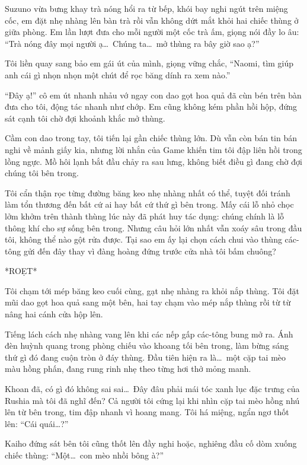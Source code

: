 ﻿\documentclass[../main.tex]{subfiles}
\begin{document}
Suzuno vừa bưng khay trà nóng hổi ra từ bếp, khói bay nghi ngút trên miệng cốc, em đặt nhẹ nhàng lên bàn trà rồi vẫn không dứt mắt khỏi hai chiếc thùng ở giữa phòng. Em lần lượt đưa cho mỗi người một cốc trà ấm, giọng nói đầy lo âu: ``Trà nóng đây mọi người ạ\dots\ Chúng ta\dots\ mở thùng ra bây giờ sao ạ?''

Tôi liền quay sang bảo em gái út của mình, giọng vững chắc, ``Naomi, tìm giúp anh cái gì nhọn nhọn một chút để rọc băng dính ra xem nào.''

``Đây ạ!'' cô em út nhanh nhảu vớ ngay con dao gọt hoa quả đã cùn bén trên bàn đưa cho tôi, động tác nhanh như chớp. Em cũng không kém phần hồi hộp, đứng sát cạnh tôi chờ đợi khoảnh khắc mở thùng.

Cầm con dao trong tay, tôi tiến lại gần chiếc thùng lớn. Dù vẫn còn bán tin bán nghi về mảnh giấy kia, nhưng lời nhắn của Game khiến tim tôi đập liên hồi trong lồng ngực. Mồ hôi lạnh bắt đầu chảy ra sau lưng, không biết điều gì đang chờ đợi chúng tôi bên trong.

Tôi cẩn thận rọc từng đường băng keo nhẹ nhàng nhất có thể, tuyệt đối tránh làm tổn thương đến bất cứ ai hay bất cứ thứ gì bên trong. Mấy cái lỗ nhỏ chọc lởm khởm trên thành thùng lúc này đã phát huy tác dụng: chúng chính là lỗ thông khí cho sự sống bên trong. Nhưng câu hỏi lớn nhất vẫn xoáy sâu trong đầu tôi, không thể nào gột rửa được. Tại sao em ấy lại chọn cách chui vào thùng các-tông gửi đến đây thay vì đàng hoàng đứng trước cửa nhà tôi bấm chuông?

*ROẸT*

Tôi chạm tới mép băng keo cuối cùng, gạt nhẹ nhàng ra khỏi nắp thùng. Tôi đặt mũi dao gọt hoa quả sang một bên, hai tay chạm vào mép nắp thùng rồi từ từ nâng hai cánh cửa hộp lên.

Tiếng lách cách nhẹ nhàng vang lên khi các nếp gấp các-tông bung mở ra. Ánh đèn huỳnh quang trong phòng chiếu vào khoang tối bên trong, làm bừng sáng thứ gì đó đang cuộn tròn ở đáy thùng. Đầu tiên hiện ra là\dots\ một cặp tai mèo màu hồng phấn, đang rung rinh nhẹ theo từng hơi thở mỏng manh.

Khoan đã, có gì đó không sai sai\dots\ Đây đâu phải mái tóc xanh lục đặc trưng của Rushia mà tôi đã nghĩ đến? Cả người tôi cứng lại khi nhìn cặp tai mèo hồng nhú lên từ bên trong, tim đập nhanh vì hoang mang. Tôi há miệng, ngẩn ngơ thốt lên: ``Cái quái\dots?''

Kaiho đứng sát bên tôi cũng thốt lên đầy nghi hoặc, nghiêng đầu cố dòm xuống chiếc thùng: ``Một\dots\ con mèo nhồi bông à?''
\end{document}
